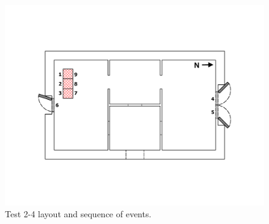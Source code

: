 \documentclass[12pt,oneside]{book}
\begin{document}
\begin{figure}[!ht]
\begin{minipage}[b]{0.9\columnwidth}
	\includegraphics[width=\columnwidth]{../Figures/Floor_Plans/East_Structure_Test_4}
\end{minipage}
\caption{Test 2-4 layout and sequence of events.}
\label{fig:Tests_2-4_layout}
\end{figure}
\end{document}
